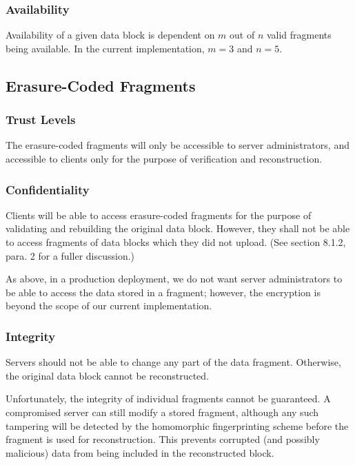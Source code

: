 \documentclass[../veristore_security_model.tex]{subfiles}
\begin{document}
\subsubsection{Availability}
\vspace{-1.5em}
Availability of a given data block is dependent on $m$ out of $n$ valid fragments being available. In the current implementation, $m=3$ and $n=5$.

\subsection{Erasure-Coded Fragments}
\vspace{-1em}
\subsubsection{Trust Levels}
\vspace{-1.5em}
The erasure-coded fragments will only be accessible to server administrators, and accessible to clients only for the purpose of verification and reconstruction.

\subsubsection{Confidentiality}
\vspace{-1.5em}
Clients will be able to access erasure-coded fragments for the purpose of validating and rebuilding the original data block. However, they shall not be able to access fragments of data blocks which they did not upload. (See section 8.1.2, para. 2 for a fuller discussion.)

As above, in a production deployment, we do not want server administrators to be able to access the data stored in a fragment; however, the encryption is beyond the scope of our current implementation.

\subsubsection{Integrity}
\vspace{-1.5em}
Servers should not be able to change any part of the data fragment. Otherwise, the original data block cannot be reconstructed.

Unfortunately, the integrity of individual fragments cannot be guaranteed. A compromised server can still modify a stored fragment, although any such tampering will be detected by the homomorphic fingerprinting scheme before the fragment is used for reconstruction. This prevents corrupted (and possibly malicious) data from being included in the reconstructed block.
\end{document}
